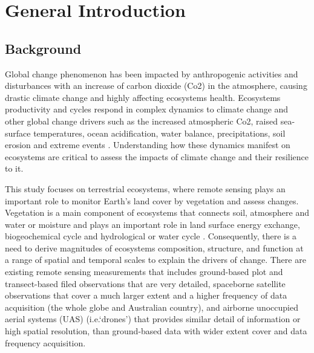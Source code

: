 \chapter{General Introduction}\label{cha:introduction}

\section{Background}
Global change phenomenon has been impacted by anthropogenic activities and disturbances with an increase of carbon dioxide (Co2) in the atmosphere, causing drastic climate change and highly affecting ecosystems health. Ecosystems productivity and cycles respond in complex dynamics to climate change and other global change drivers such as the increased atmospheric Co2, raised sea-surface temperatures, ocean acidification, water balance, precipitations, soil erosion and extreme events \citep{malhiClimateChangeEcosystems2020, dronovaRemoteSensingPhenology2022}. Understanding how these dynamics manifest on ecosystems are critical to assess the impacts of climate change and their resilience to it.

This study focuses on terrestrial ecosystems, where remote sensing plays an important role to monitor Earth’s land cover by vegetation and assess changes. Vegetation is a main component of ecosystems that connects soil, atmosphere and water or moisture and plays an important role in land surface energy exchange, biogeochemical cycle and hydrological or water cycle \citep{zhangFractionalVegetationCover2019, liangChapter12Fractional2020}.
Consequently, there is a need to derive magnitudes of ecosystems composition, structure, and function at a range of spatial and temporal scales to explain the drivers of change. 
There are existing remote sensing measurements that includes ground-based plot and transect-based filed observations that are very detailed, spaceborne satellite observations that cover a much larger extent and a higher frequency of data acquisition (the whole globe and Australian country), and airborne unoccupied aerial systems (UAS) (i.e.‘drones’) that provides similar detail of information or high spatial resolution, than ground-based data with wider extent cover and data frequency acquisition.

